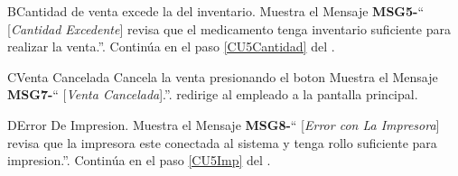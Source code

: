 		\begin{UCtrayectoriaA}{B}{Cantidad de venta excede la del inventario.}
			\UCpaso Muestra el Mensaje {\bf MSG5-}`` [{\em Cantidad Excedente}] revisa que el medicamento tenga inventario suficiente para realizar la venta.''.
			\UCpaso Continúa en el paso \ref{CU5Cantidad} del .
		\end{UCtrayectoriaA}

		 \begin{UCtrayectoriaA}{C}{Venta Cancelada}
			\UCpaso [\UCactor] Cancela la venta presionando el boton 
			\UCpaso Muestra el Mensaje {\bf MSG7-}`` [{\em Venta Cancelada}].''.
			\UCpaso   redirige al empleado a la pantalla principal.
		\end{UCtrayectoriaA}

		\begin{UCtrayectoriaA}{D}{Error De Impresion.}
			\UCpaso Muestra el Mensaje {\bf MSG8-}`` [{\em Error con La Impresora}] revisa que la impresora este conectada al sistema y tenga rollo suficiente para impresion.''.
			\UCpaso Continúa en el paso \ref{CU5Imp} del .
		\end{UCtrayectoriaA}


